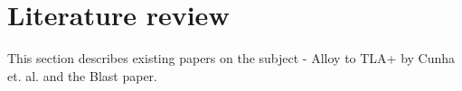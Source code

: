 \section{Literature review}


This section describes existing papers on the subject - Alloy to TLA+ by Cunha et. al. and the Blast paper.